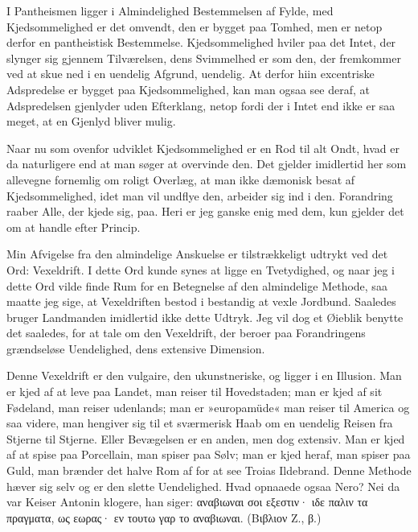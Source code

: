 \documentclass[12pt,a4paper]{article}
\begin{document}
I Pantheismen ligger i Almindelighed Bestemmelsen af Fylde, med Kjedsommelighed er det omvendt, den er bygget paa Tomhed, men er netop derfor en pantheistisk Bestemmelse. Kjedsommelighed hviler paa det Intet, der slynger sig gjennem Tilværelsen, dens Svimmelhed er som den, der fremkommer ved at skue ned i en uendelig Afgrund, uendelig. At derfor hiin excentriske Adspredelse er bygget paa Kjedsommelighed, kan man ogsaa see deraf, at Adspredelsen gjenlyder uden Efterklang, netop fordi der i Intet end ikke er saa meget, at en Gjenlyd bliver mulig.

Naar nu som ovenfor udviklet Kjedsommelighed er en Rod til alt Ondt, hvad er da naturligere end at man søger at overvinde den. Det gjelder imidlertid her som allevegne fornemlig om roligt Overlæg, at man ikke dæmonisk besat af Kjedsommelighed, idet man vil undflye den, arbeider sig ind i den. Forandring raaber Alle, der kjede sig, paa. Heri er jeg ganske enig med dem, kun gjelder det om at handle efter Princip.

Min Afvigelse fra den almindelige Anskuelse er tilstrækkeligt udtrykt ved det Ord: Vexeldrift. I dette Ord kunde synes at ligge en Tvetydighed, og naar jeg i dette Ord vilde finde Rum for en Betegnelse af den almindelige Methode, saa maatte jeg sige, at Vexeldriften bestod i bestandig at vexle Jordbund. Saaledes bruger Landmanden imidlertid ikke dette Udtryk. Jeg vil dog et Øieblik benytte det saaledes, for at tale om den Vexeldrift, der beroer paa Forandringens grændseløse Uendelighed, dens extensive Dimension.

Denne Vexeldrift er den vulgaire, den ukunstneriske, og ligger i en Illusion. Man er kjed af at leve paa Landet, man reiser til Hovedstaden; man er kjed af sit Fødeland, man reiser udenlands; man er »europamüde« man reiser til America og saa videre, man hengiver sig til et sværmerisk Haab om en uendelig Reisen fra Stjerne til Stjerne. Eller Bevægelsen er en anden, men dog extensiv. Man er kjed af at spise paa Porcellain, man spiser paa Sølv; man er kjed heraf, man spiser paa Guld, man brænder det halve Rom af for at see Troias Ildebrand. Denne Methode hæver sig selv og er den slette Uendelighed. Hvad opnaaede ogsaa Nero? Nei da var Keiser Antonin klogere, han siger: αναβιωναι σοι εξεστιν· ιδε παλιν τα πραγματα, ως εωρας· εν τουτω γαρ το αναβιωναι. (Bιβλιον Z., β.)
\end{document}
